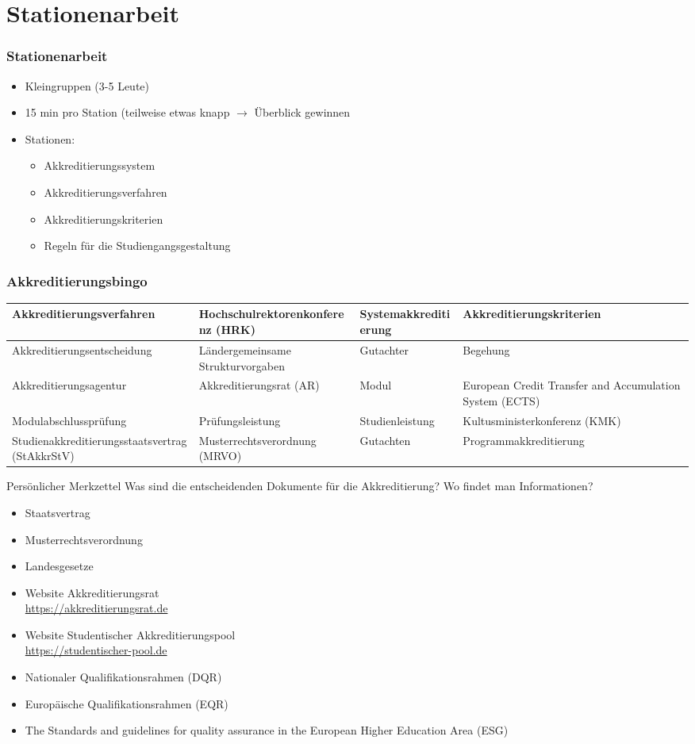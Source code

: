 \documentclass[german,10pt,xcolor=colortbl,compress]{beamer}
\makeatletter
\def\bingo{
\footnotesize
  \begin{tabular}{|m{.2\textwidth}|m{.2\textwidth}|m{.2\textwidth}|m{.2\textwidth}|}
  \hline
  Akkreditierungs\-verfahren & Hochschul\-rektorenkonferenz (HRK) & System\-akkreditierung & Akkreditierungs\-kriterien \\\hline
  Akkreditierungs\-entscheidung & L\"andergemein\-same Struktur\-vorgaben & Gutachter & Begehung \\\hline
  Akkreditierungs\-agentur & Akkreditierungs\-rat (AR) & Modul & European Credit Transfer and Accumulation System (ECTS) \\\hline
  Modulabschluss\-pr\"ufung & Pr\"ufungs\-leistung & Studien\-leistung & Kultusminister\-konferenz (KMK) \\\hline
  Studienakkredi\-tierungsstaats\-vertrag\newline (StAkkrStV) & Musterrechts\-verordnung (MRVO) &  Gutachten & Programm\-akkreditierung \\\hline
  \end{tabular}
}
\let\o@url\url
\renewcommand\url[1]{\bgroup\color{blue} \o@url{#1}\egroup}
\makeatother
\begin{document}
\section{Stationenarbeit}
\frame{\tableofcontents[currentsection]}
\begin{frame} 
  \frametitle{Stationenarbeit} 
  \begin{itemize}
  	\item Kleingruppen (3-5 Leute)
  	\item 15 min pro Station (teilweise etwas knapp $\rightarrow$ Überblick gewinnen
  	\vspace{0.5 cm}
  	\item Stationen:
  	\begin{itemize}
  		\item Akkreditierungssystem
  		\item Akkreditierungsverfahren
  		\item Akkreditierungskriterien
  		\item Regeln für die Studiengangsgestaltung
  	\end{itemize}
  \end{itemize}   
\end{frame}
\begin{frame} 
  \frametitle{Akkreditierungsbingo} 
  \bingo
\end{frame}
\begin{frame}{Persönlicher Merkzettel}
Was sind die entscheidenden Dokumente für die Akkreditierung? Wo findet man Informationen?
\begin{itemize}
\item Staatsvertrag
\item Musterrechtsverordnung
\item Landesgesetze
\end{itemize}
\pause
\begin{itemize}
\item Website Akkreditierungsrat\\\url{https://akkreditierungsrat.de}
\item Website Studentischer Akkreditierungspool\\\url{https://studentischer-pool.de}
\end{itemize}
\pause
\begin{itemize}
\item Nationaler Qualifikationsrahmen (DQR)
\item Europäische Qualifikationsrahmen (EQR)
\item The Standards and guidelines for quality assurance in the European Higher Education Area (ESG)
\end{itemize}
\end{frame}
\end{document}

